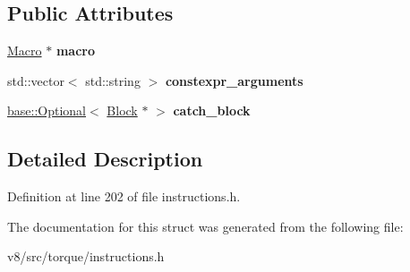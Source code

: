 \subsection*{Public Attributes}
\begin{DoxyCompactItemize}
\item 
\mbox{\label{structv8_1_1internal_1_1torque_1_1CallCsaMacroInstruction_a12ff1818471179b1905b627c71565ffd}} 
\mbox{\hyperlink{classv8_1_1internal_1_1torque_1_1Macro}{Macro}} $\ast$ {\bfseries macro}
\item 
\mbox{\label{structv8_1_1internal_1_1torque_1_1CallCsaMacroInstruction_a914b050dc2e8c0e4d0cb62ed755d83dc}} 
std\+::vector$<$ std\+::string $>$ {\bfseries constexpr\+\_\+arguments}
\item 
\mbox{\label{structv8_1_1internal_1_1torque_1_1CallCsaMacroInstruction_aa6a9d65971768d3c82c9670e141c5223}} 
\mbox{\hyperlink{classv8_1_1base_1_1Optional}{base\+::\+Optional}}$<$ \mbox{\hyperlink{classv8_1_1internal_1_1torque_1_1Block}{Block}} $\ast$ $>$ {\bfseries catch\+\_\+block}
\end{DoxyCompactItemize}


\subsection{Detailed Description}


Definition at line 202 of file instructions.\+h.



The documentation for this struct was generated from the following file\+:\begin{DoxyCompactItemize}
\item 
v8/src/torque/instructions.\+h\end{DoxyCompactItemize}
